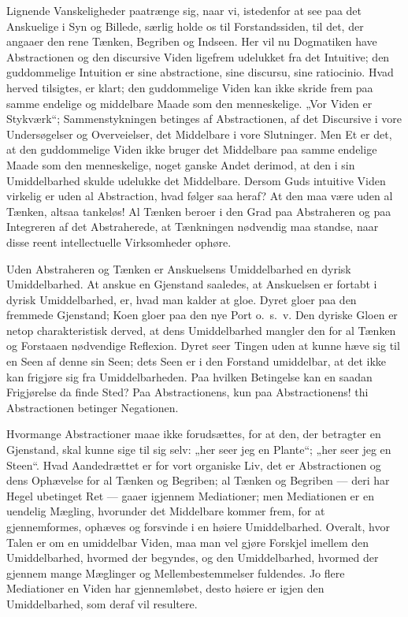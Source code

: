\documentclass[12pt]{book}
\newcommand{\opage}[1]{\marginnote{\footnotesize\textit{[#1]}}}
\begin{document}
Lignende Vanskeligheder paatrænge sig, naar vi, istedenfor at see paa det Anskuelige i Syn og
Billede, særlig holde os til Forstandssiden, til det, der angaaer den rene Tænken, Begriben og
Indseen. Her vil nu Dogmatiken have Abstractionen og den discursive Viden ligefrem udelukket fra
det Intuitive; den guddommelige Intuition er sine abstractione, sine discursu, sine ratiocinio.
Hvad herved tilsigtes, er klart; den guddommelige Viden kan ikke skride frem paa samme endelige og
middelbare Maade som den menneskelige. „Vor Viden er Stykværk“; Sammenstykningen betinges af
Abstractionen, af det Discursive i vore Undersøgelser og Overveielser,
\opage{241} det Middelbare i vore Slutninger. Men Et er det, at den guddommelige Viden ikke bruger det
Middelbare paa samme endelige Maade som den menneskelige, noget ganske Andet derimod, at den i sin
Umiddelbarhed skulde udelukke det Middelbare. Dersom Guds intuitive Viden virkelig er uden al
Abstraction, hvad følger saa heraf? At den maa være uden al Tænken, altsaa tankeløs! Al Tænken
beroer i den Grad paa Abstraheren og paa Integreren af det Abstraherede, at Tænkningen nødvendig maa
standse, naar disse reent intellectuelle Virksomheder ophøre.

Uden Abstraheren og Tænken er Anskuelsens Umiddelbarhed en dyrisk Umiddelbarhed. At anskue en
Gjenstand saaledes, at Anskuelsen er fortabt i dyrisk Umiddelbarhed, er, hvad man kalder at gloe.
Dyret gloer paa den fremmede Gjenstand; Koen gloer paa den nye Port o.\ s.\ v. Den dyriske Gloen er
netop charakteristisk derved, at dens Umiddelbarhed mangler den for al Tænken og Forstaaen
nødvendige Reflexion. Dyret seer Tingen uden at kunne hæve sig til en Seen af denne sin Seen; dets
Seen er i den Forstand umiddelbar, at det ikke kan frigjøre sig fra Umiddelbarheden. Paa hvilken
Betingelse kan en saadan Frigjørelse da finde Sted? Paa Abstractionens, kun paa Abstractionens! thi
Abstractionen betinger Negationen.

Hvormange Abstractioner maae ikke forudsættes, for at den, der betragter en Gjenstand, skal kunne
sige til sig selv: „her seer jeg en Plante“; „her seer jeg en Steen“. Hvad Aandedrættet er for vort
organiske Liv, det er Abstractionen og dens Ophævelse for al Tænken og Begriben; al Tænken og
Begriben --- deri har Hegel ubetinget Ret --- gaaer igjennem Mediationer; men Mediationen er en
uendelig Mægling, hvorunder det Middelbare kommer frem, for at gjennemformes, ophæves og forsvinde
i en høiere Umiddelbarhed. Overalt, hvor Talen er om en umiddelbar Viden, maa man vel gjøre Forskjel
imellem den Umiddelbarhed, hvormed der begyndes, og den Umiddelbarhed, hvormed der
\opage{242} gjennem mange Mæglinger og Mellembestemmelser fuldendes. Jo flere Mediationer en Viden har
gjennemløbet, desto høiere er igjen den Umiddelbarhed, som deraf vil resultere.
\end{document}
